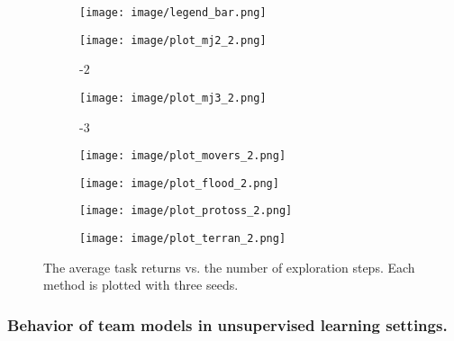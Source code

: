 \begin{figure}[t]
\newcommand\gap{0.30}
\newcommand\subgap{0.98}
  \centering
  \begin{subfigure}[b]{\linewidth}
      \centering
      \texttt{[image: image/legend\_bar.png]}
  \end{subfigure}
  \begin{subfigure}[b]{\gap\linewidth}
      \centering
      \texttt{[image: image/plot\_mj2\_2.png]}
      \caption{\simplemulti-$2$}
      \label{fig: mj2 plot}
  \end{subfigure}
  \hfill  
  \begin{subfigure}[b]{\gap\linewidth}
      \centering
      \texttt{[image: image/plot\_mj3\_2.png]}
      \caption{\simplemulti-$3$}
      \label{fig: mj3 plot}
  \end{subfigure}
  \hfill  
  \begin{subfigure}[b]{\gap\linewidth}
      \centering
      \texttt{[image: image/plot\_movers\_2.png]}
      \caption{\movers}
      \label{fig: movers plot}
  \end{subfigure}
  \hfill  
  \begin{subfigure}[b]{\gap\linewidth}
      \centering
      \texttt{[image: image/plot\_flood\_2.png]}
      \caption{\rescue}
      \label{fig: flood plot}
  \end{subfigure}
  \hfill  
  \begin{subfigure}[b]{\gap\linewidth}
      \centering
      \texttt{[image: image/plot\_protoss\_2.png]}
      \caption{\protoss}
      \label{fig: protoss plot}
  \end{subfigure}
  \hfill  
  \begin{subfigure}[b]{\gap\linewidth}
      \centering
      \texttt{[image: image/plot\_terran\_2.png]}
      \caption{\terran}
      \label{fig: terran plot}
  \end{subfigure}

  \captionsetup{subrefformat=parens}
  \caption{The average task returns vs. the number of exploration steps. Each method is plotted with three seeds.}
  \label{fig: plots}
\end{figure}

\subsubsection{Behavior of team models in unsupervised learning settings.}

